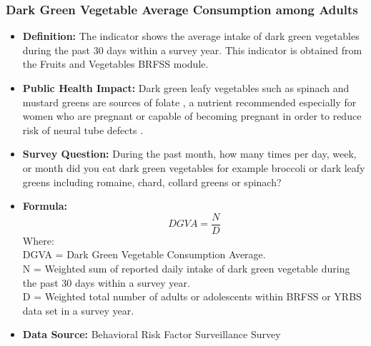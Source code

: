 \documentclass[12pt,letterpaper]{report}
\begin{document}
		\subsubsection{Dark Green Vegetable Average Consumption among Adults} 
	\begin{itemize}
		\item \textbf{Definition:} The indicator shows the average intake of dark green vegetables during the past 30 days within a survey year. This indicator is obtained from the Fruits and Vegetables BRFSS module.
		\item \textbf{Public Health Impact:} Dark green leafy vegetables such as spinach and mustard greens are sources of folate \cite{subar1989folate}, a nutrient recommended especially for women who are pregnant or capable of becoming pregnant in order to reduce risk of neural tube defects \cite{daly1995folate}.
		\item \textbf{Survey Question:} During the past month, how many times per day, week, or month did you eat dark green vegetables for example broccoli or dark leafy greens including romaine, chard, collard greens or spinach?
		\item \textbf{Formula:} 
			\begin{equation}
				DGVA = \frac{N}{D}
			\end{equation}
Where: \\
			DGVA = Dark Green Vegetable Consumption Average.\\
			
			N = Weighted sum of reported daily intake of dark green vegetable during the past 30 days within a survey year.\\
			
			D = Weighted total number of adults or adolescents within BRFSS or YRBS data set in a survey year.\\
			
		\item \textbf{Data Source:} Behavioral Risk Factor Surveillance Survey
	\end{itemize}

\end{document}
